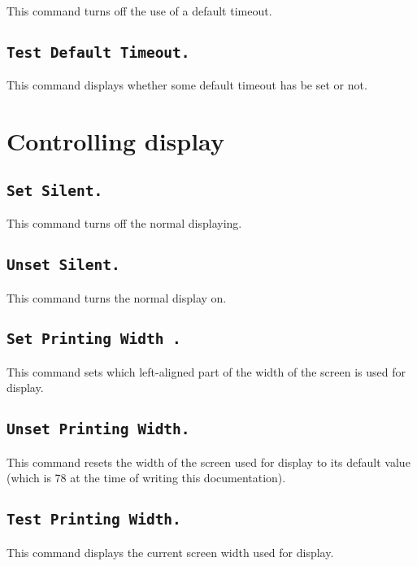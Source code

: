 This command turns off the use of a default timeout.

\subsection[\tt Test Default Timeout.]{\tt Test Default Timeout.}

This command displays whether some default timeout has be set or not.

\section{Controlling display}

\subsection[\tt Set Silent.]{\tt Set Silent.
\label{Begin-Silent}
}
This command turns off the normal displaying.

\subsection[\tt Unset Silent.]{\tt Unset Silent.}
This command turns the normal display on.

\subsection[\tt Set Printing Width {\integer}.]{\tt Set Printing Width {\integer}.}
This command sets which left-aligned part of the width of the screen
is used for display. 

\subsection[\tt Unset Printing Width.]{\tt Unset Printing Width.}
This command resets the width of the screen used for display to its
default value (which is 78 at the time of writing this documentation).

\subsection[\tt Test Printing Width.]{\tt Test Printing Width.}
This command displays the current screen width used for display.

